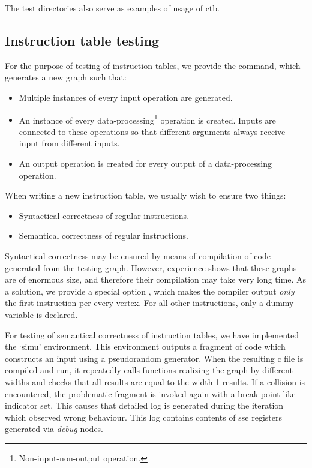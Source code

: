 The test directories also serve as examples of usage of ctb.

\subsection*{Instruction table testing}

For the purpose of testing of instruction tables, we provide the  command, which generates a new graph such that:
\begin{itemize}
  \item Multiple instances of every input operation are generated.
  \item An instance of every data-processing\footnote{Non-input-non-output operation.} operation is created. Inputs are connected to these operations so that different arguments always receive input from different inputs.
  \item An output operation is created for every output of a data-processing operation.
\end{itemize}

When writing a new instruction table, we usually wish to ensure two things:
\begin{itemize}
  \item Syntactical correctness of regular instructions.
  \item Semantical correctness of regular instructions.
\end{itemize}

Syntactical correctness may be ensured by means of compilation of code generated from the testing graph. However, experience shows that these graphs are of enormous size, and therefore their compilation may take very long time. As a solution, we provide a special option , which makes the compiler output \emph{only} the first instruction per every vertex. For all other instructions, only a dummy variable is declared.

For testing of semantical correctness of instruction tables, we have implemented the `simu' environment. This environment outputs a fragment of code which constructs an input using a pseudorandom generator. When the resulting c file is compiled and run, it repeatedly calls functions realizing the graph by different widths and checks that all results are equal to the width 1 results. If a collision is encountered, the problematic fragment is invoked again with a break-point-like indicator set. This causes that detailed log is generated during the iteration which observed wrong behaviour. This log contains contents of sse registers generated via \emph{debug} nodes.


